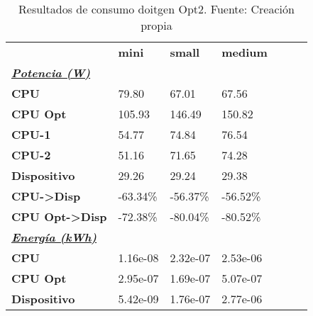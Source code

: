 \begin{table}[H]
    \centering
    \begin{tabular}{lllllll}
    \rowcolor[HTML]{DAE8FC} \ & \textbf{mini} & \textbf{	small} & \textbf{	medium} \\
    \cellcolor[HTML]{DAE8FC} \textbf{\textbf{{\emph{{\underline{{Potencia (W)}}}}}}} &  & 	 & 	 \\
    \rowcolor[HTML]{EFEFEF} \cellcolor[HTML]{DAE8FC} \textbf{CPU} & 79.80 & 	67.01 & 	67.56 \\
    \cellcolor[HTML]{DAE8FC} \textbf{CPU Opt} & 105.93 & 	146.49 & 	150.82 \\
    \rowcolor[HTML]{EFEFEF} \cellcolor[HTML]{DAE8FC} \textbf{\quad CPU-1} & 54.77 & 	74.84 & 	76.54 \\
    \cellcolor[HTML]{DAE8FC} \textbf{\quad CPU-2} & 51.16 & 	71.65 & 	74.28 \\
    \rowcolor[HTML]{EFEFEF} \cellcolor[HTML]{DAE8FC} \textbf{Dispositivo} & 29.26 & 	29.24 & 	29.38 \\
    \cellcolor[HTML]{DAE8FC} \textbf{CPU->Disp} & -63.34\% & 	-56.37\% & 	-56.52\% \\
    \rowcolor[HTML]{EFEFEF} \cellcolor[HTML]{DAE8FC} \textbf{CPU Opt->Disp} & -72.38\% & 	-80.04\% & 	-80.52\% \\
    \cellcolor[HTML]{DAE8FC} \textbf{\textbf{{\emph{{\underline{{Energía (kWh)}}}}}}} &  & 	 & 	 \\
    \rowcolor[HTML]{EFEFEF} \cellcolor[HTML]{DAE8FC} \textbf{CPU} & 1.16e-08 & 	2.32e-07 & 	2.53e-06 \\
    \cellcolor[HTML]{DAE8FC} \textbf{CPU Opt} & 2.95e-07 & 	1.69e-07 & 	5.07e-07 \\
    \rowcolor[HTML]{EFEFEF} \cellcolor[HTML]{DAE8FC} \textbf{Dispositivo} & 5.42e-09 & 	1.76e-07 & 	2.77e-06 \\
    \end{tabular}
    \caption[Resultados de consumo doitgen Opt2]{{Resultados de consumo doitgen Opt2. Fuente: Creación propia}}
    \label{table_test_doitgen_Opt2_hw_powerResults}
\end{table}